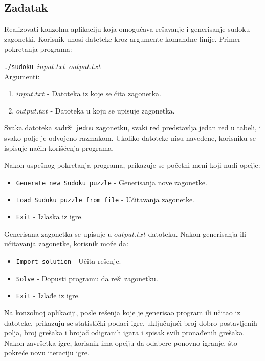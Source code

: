 \documentclass[a4paper]{article}
\begin{document}
    \subsection{Zadatak}
    Realizovati konzolnu aplikaciju koja omogućava rešavanje i generisanje sudoku zagonetki. Korisnik unosi dateteke kroz argumente komandne linije. 
    Primer pokretanja programa:
    \par\texttt{./sudoku $input.txt$ $output.txt$}\\
    Argumenti:
    \begin{enumerate}
        \item $input.txt$ - Datoteka iz koje se čita zagonetka.
        \item $output.txt$ - Datoteka u koju se upisuje zagonetka.
    \end{enumerate}
    \par Svaka datoteka sadrži \texttt{jednu} zagonetku, svaki red predstavlja jedan red u tabeli, i svako polje je odvojeno razmakom. Ukoliko datoteke nisu navedene,
    korisniku se ispisuje način korišćenja programa.
    \par Nakon uspešnog pokretanja programa, prikazuje se početni meni koji nudi opcije:
    \begin{itemize}
        \item \texttt{Generate new Sudoku puzzle} - Generisanja nove zagonetke.
        \item \texttt{Load Sudoku puzzle from file} - Učitavanja zagonetke.
        \item \texttt{Exit} - Izlaska iz igre.
    \end{itemize}
    Generisana zagonetka se upisuje u $output.txt$ datoteku.
    Nakon generisanja ili učitavanja zagonetke, korisnik može da:
    \begin{itemize}
        \item \texttt{Import solution} - Učita rešenje.
        \item \texttt{Solve} - Dopusti programu da reši zagonetku.
        \item \texttt{Exit} - Izlađe iz igre.
    \end{itemize}
    \par Na konzolnoj aplikaciji, posle rešenja koje je generisao program ili učitao iz datoteke, prikazuju se statistički podaci igre, uključujući broj dobro 
    postavljenih polja, broj grešaka i brojač odigranih igara i spisak svih pronađenih grešaka. Nakon završetka igre, korisnik ima opciju da odabere ponovno igranje, 
    što pokreće novu iteraciju igre.
    \newpage
\end{document}
